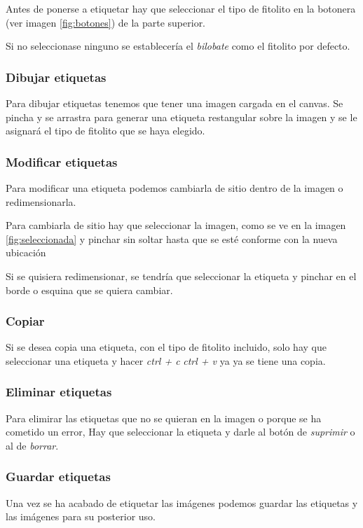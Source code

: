 Antes de ponerse a etiquetar hay que seleccionar el tipo de fitolito en la botonera (ver imagen \ref{fig:botones}) de la parte superior.

Si no seleccionase ninguno se establecería el \textit{bilobate} como el fitolito por defecto.

\subsubsection{Dibujar etiquetas}
Para dibujar etiquetas tenemos que tener una imagen cargada en el canvas. Se pincha y se arrastra para generar una etiqueta restangular sobre la imagen y se le asignará el tipo de fitolito que se haya elegido.

\subsubsection{Modificar etiquetas}
Para modificar una etiqueta podemos cambiarla de sitio dentro de la imagen o redimensionarla.

Para cambiarla de sitio hay que seleccionar la imagen, como se ve en la imagen \ref{fig:seleccionada} y pinchar sin soltar hasta que se esté conforme con la nueva ubicación

Si se quisiera redimensionar, se tendría que seleccionar la etiqueta y pinchar en el borde o esquina que se quiera cambiar.

\subsubsection{Copiar}
Si se desea copia una etiqueta, con el tipo de fitolito incluido, solo hay que seleccionar una etiqueta y hacer \textit{ctrl + c}
\textit{ctrl + v} ya ya se tiene una copia.
\subsubsection{Eliminar etiquetas}
Para elimirar las etiquetas que no se quieran en la imagen o porque se ha cometido un error, Hay que seleccionar la etiqueta y darle al botón de \textit{suprimir} o al de \textit{borrar}.
\subsubsection{Guardar etiquetas}
Una vez se ha acabado de etiquetar las imágenes podemos guardar las etiquetas y las imágenes para su posterior uso.

